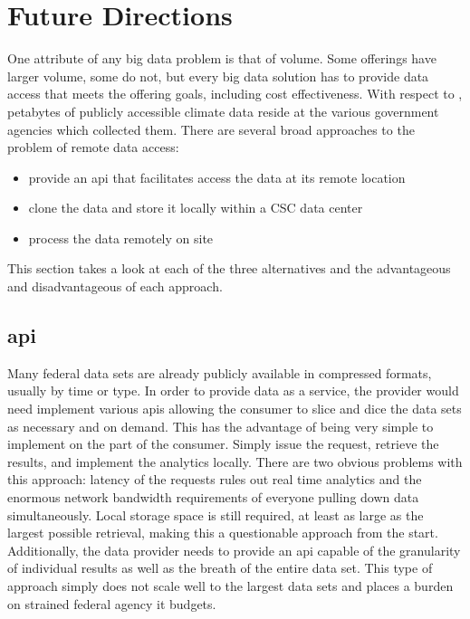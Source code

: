 
\section{Future Directions}
One attribute of any big data problem is that of volume. Some offerings have larger volume, some do not, but every big data solution  has to provide data access that meets the offering goals, including cost effectiveness. With respect to \climatedge, petabytes of publicly accessible climate data reside at the various  government agencies which collected them. There are several broad approaches to the problem of remote data access:
\begin{itemize}
    \item provide an \gls{api} that facilitates access the data at its remote location
    \item clone the data and store it locally within a \textsc{CSC} data center
    \item process the data remotely on site
\end{itemize}
This section takes a look at each of the three alternatives and the advantageous and disadvantageous of each approach.
\subsection{\gls{api}}
Many federal data sets are already publicly available in compressed formats, usually by time or type. In order to provide data as a service, the provider would need implement various \gls{api}s allowing the consumer to slice and dice the data sets as necessary and on demand. This has the advantage of being very simple to implement on the part of the consumer. Simply issue the request, retrieve the results, and implement the analytics locally. There are two obvious problems with this approach: latency of the requests rules out real time analytics and the enormous network bandwidth requirements of everyone pulling down data simultaneously. Local storage space is still required, at least as large as the largest possible retrieval, making this a questionable approach from the start. Additionally, the data provider needs to provide an \gls{api} capable of the granularity of individual results as well as the breath of the entire data set. This type of approach simply does not scale well to the largest data sets and places a burden on strained federal agency \gls{it} budgets.
